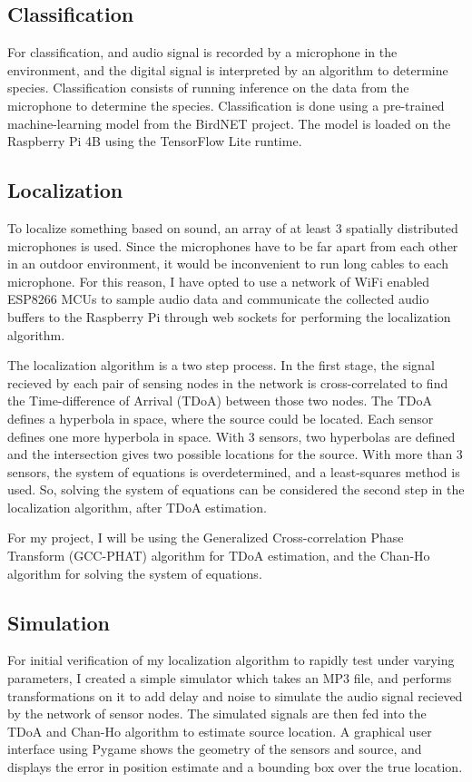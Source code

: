 \documentclass[12pt]{article}
\begin{document}
\subsection{Classification}
For classification, and audio signal is recorded by a microphone in the environment, and the digital signal is interpreted by an algorithm to determine species. Classification consists of running inference on the data from the microphone to determine the species. Classification is done using a pre-trained machine-learning model from the BirdNET project. The model is loaded on the Raspberry Pi 4B using the TensorFlow Lite runtime. 

\subsection{Localization}
To localize something based on sound, an array of at least 3 spatially distributed microphones is used. Since the microphones have to be far apart from each other in an outdoor environment, it would be inconvenient to run long cables to each microphone. For this reason, I have opted to use a network of WiFi enabled ESP8266 MCUs to sample audio data and communicate the collected audio buffers to the Raspberry Pi through web sockets for performing the localization algorithm.

The localization algorithm is a two step process. In the first stage, the signal recieved by each pair of sensing nodes in the network is cross-correlated to find the Time-difference of Arrival (TDoA) between those two nodes. The TDoA defines a hyperbola in space, where the source could be located. Each sensor defines one more hyperbola in space. With 3 sensors, two hyperbolas are defined and the intersection gives two possible locations for the source. With more than 3 sensors, the system of equations is overdetermined, and a least-squares method is used. So, solving the system of equations can be considered the second step in the localization algorithm, after TDoA estimation.

For my project, I will be using the Generalized Cross-correlation Phase Transform (GCC-PHAT) algorithm for TDoA estimation, and the Chan-Ho algorithm for solving the system of equations.

\subsection{Simulation}
For initial verification of my localization algorithm to rapidly test under varying parameters, I created a simple simulator which takes an MP3 file, and performs transformations on it to add delay and noise to simulate the audio signal recieved by the network of sensor nodes. The simulated signals are then fed into the TDoA and Chan-Ho algorithm to estimate source location. A graphical user interface using Pygame shows the geometry of the sensors and source, and displays the error in position estimate and a bounding box over the true location.
\end{document}
